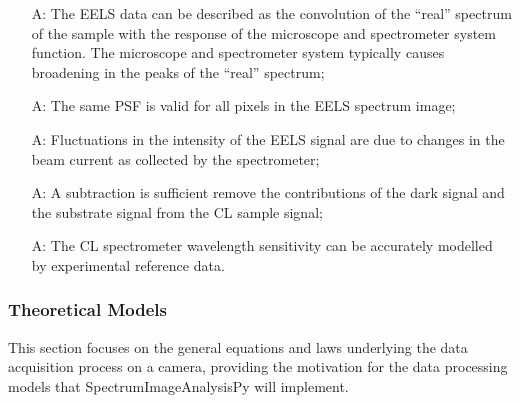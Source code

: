 \documentclass[12pt]{article}
\newcounter{assumpnum} %
\newcommand{\progname}{SpectrumImageAnalysisPy} %
\begin{document}
\begin{itemize}

	\item[A\refstepcounter{assumpnum}\theassumpnum \label{EELS_System_Response}:] The EELS data can be described as the convolution of the ``real'' spectrum of the sample with the response of the microscope and spectrometer system function. The microscope and spectrometer system typically causes broadening in the peaks of the ``real'' spectrum;
	
	\item[A\refstepcounter{assumpnum}\theassumpnum \label{EELS_PSF_variability}:] The same PSF is valid for all pixels in the EELS spectrum image;
	
	\item[A\refstepcounter{assumpnum}\theassumpnum \label{EELS_Intensity_Fluctuations}:] Fluctuations in the intensity of the EELS signal are due to changes in the beam current as collected by the spectrometer;
	
	\item[A\refstepcounter{assumpnum}\theassumpnum \label{CL_Background}:] A subtraction is sufficient remove the contributions of the dark signal and the substrate signal from the CL sample signal;
	
	\item[A\refstepcounter{assumpnum}\theassumpnum \label{CL_System_Response}:] The CL spectrometer wavelength sensitivity can be accurately modelled by experimental reference data.

\end{itemize}

\subsubsection{Theoretical Models}\label{sec_theoretical}

This section focuses on the general equations and laws underlying the data acquisition process on a camera, providing the motivation for the data processing models that \progname{} will implement.

~\newline
\end{document}
